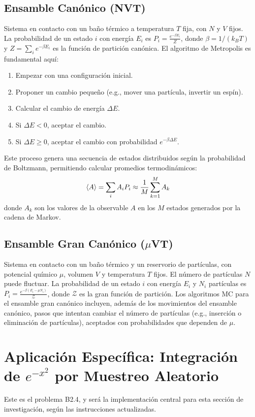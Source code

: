 \documentclass[11pt,a4paper]{article}
\begin{document}
\subsection{Ensamble Canónico (NVT)}
Sistema en contacto con un baño térmico a temperatura $T$ fija, con $N$ y $V$ fijos. La probabilidad de un estado $i$ con energía $E_i$ es $P_i = \frac{e^{-\beta E_i}}{Z}$, donde $\beta = 1/(k_B T)$ y $Z = \sum_i e^{-\beta E_i}$ es la función de partición canónica.
El algoritmo de Metropolis es fundamental aquí:
\begin{enumerate}
    \item Empezar con una configuración inicial.
    \item Proponer un cambio pequeño (e.g., mover una partícula, invertir un espín).
    \item Calcular el cambio de energía $\Delta E$.
    \item Si $\Delta E < 0$, aceptar el cambio.
    \item Si $\Delta E \ge 0$, aceptar el cambio con probabilidad $e^{-\beta \Delta E}$.
\end{enumerate}
Este proceso genera una secuencia de estados distribuidos según la probabilidad de Boltzmann, permitiendo calcular promedios termodinámicos:
\[ \expval{A} = \sum_i A_i P_i \approx \frac{1}{M} \sum_{k=1}^M A_k \]
donde $A_k$ son los valores de la observable $A$ en los $M$ estados generados por la cadena de Markov.

\subsection{Ensamble Gran Canónico ($\mu$VT)}
Sistema en contacto con un baño térmico y un reservorio de partículas, con potencial químico $\mu$, volumen $V$ y temperatura $T$ fijos. El número de partículas $N$ puede fluctuar.
La probabilidad de un estado $i$ con energía $E_i$ y $N_i$ partículas es $P_i = \frac{e^{-\beta (E_i - \mu N_i)}}{\mathcal{Z}}$, donde $\mathcal{Z}$ es la gran función de partición.
Los algoritmos MC para el ensamble gran canónico incluyen, además de los movimientos del ensamble canónico, pasos que intentan cambiar el número de partículas (e.g., inserción o eliminación de partículas), aceptados con probabilidades que dependen de $\mu$.

\section{Aplicación Específica: Integración de $e^{-x^2}$ por Muestreo Aleatorio}
Este es el problema B2.4, y será la implementación central para esta sección de investigación, según las instrucciones actualizadas.
\end{document}
